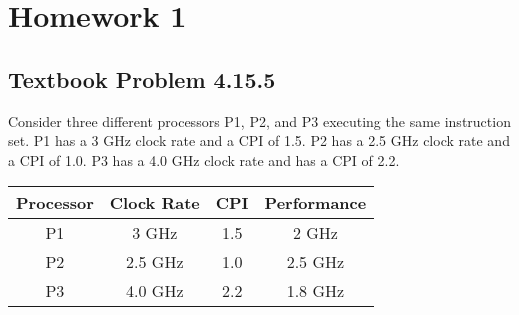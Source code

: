\documentclass[12pt]{article}
\begin{document}
\section{Homework 1}

\subsection{Textbook Problem 4.15.5}
Consider three different processors P1, P2, and P3 executing the same instruction set. 
P1 has a 3 GHz clock rate and a CPI of 1.5. P2 has a 2.5 GHz clock rate and a CPI of 1.0. 
P3 has a 4.0 GHz clock rate and has a CPI of 2.2.

\begin{center}
    \begin{tabular}{|c|c|c|c|}
        \hline
        Processor & Clock Rate & CPI & Performance \\
        \hline
        P1 & 3 GHz & 1.5 & 2 GHz \\
        \hline
        P2 & 2.5 GHz & 1.0 & 2.5 GHz \\
        \hline
        P3 & 4.0 GHz & 2.2 & 1.8 GHz \\
        \hline
    \end{tabular}
\end{center}
\end{document}
